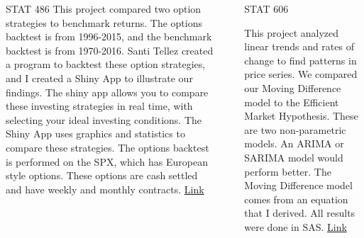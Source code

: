 \documentclass[final]{beamer}
\newlength{\sepwid}
\newlength{\onecolwid}
\newlength{\twocolwid}
\begin{document}
\begin{frame}[t]
\begin{columns}[t]
\begin{column}{\twocolwid}
\begin{columns}[t,totalwidth=\twocolwid]
\begin{column}{\onecolwid}
\begin{block}{STAT 486}
This project compared two option strategies to benchmark returns. The 
options backtest is from 1996-2015, and the benchmark backtest is from 
1970-2016. Santi Tellez created a program to backtest these option 
strategies, and I created a Shiny App to illustrate our findings. The 
shiny app allows you to compare these investing strategies in real 
time, with selecting your ideal investing conditions. The Shiny App 
uses graphics and statistics to compare these strategies. The options 
backtest is performed on the SPX, which has European style options. 
These options are cash settled and have weekly and monthly contracts.
\href{https://www.dropbox.com/s/u5spikswrc800rw/stat-486.pdf?dl=0}
{Link}

\end{block}


\end{column} %

\end{columns} %

\end{column} %

\begin{column}{\sepwid}\end{column} %

\begin{column}{\onecolwid} %


\begin{block}{STAT 606}

This project analyzed linear trends and rates of 
change to find patterns in price series. We compared 
our Moving Difference model to the Efficient Market 
Hypothesis. These are two non-parametric models. An 
ARIMA or SARIMA model would perform better. The Moving Difference 
model comes from an equation that I derived. All results were done in 
SAS. 
\href{https://www.dropbox.com/s/qoq73022kcygtn2/stat-606.pdf?dl=0}
{Link}

\end{block}



\end{column}
\end{columns}
\end{frame}
\end{document}
